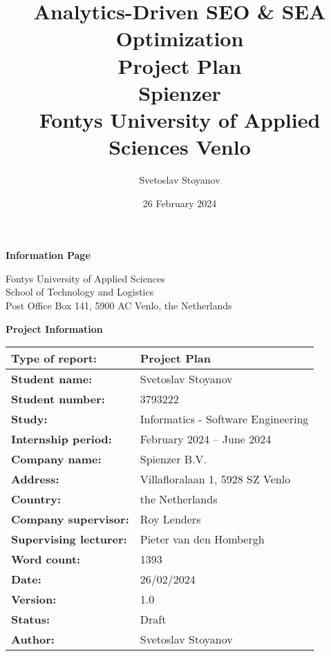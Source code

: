 \documentclass[12pt,a4paper]{article}
\title{
    {\Large Analytics-Driven SEO \& SEA Optimization}\\
    {\large Project Plan}\\[1em]
    {\normalsize \textbf{Spienzer}}\\
    {\normalsize Fontys University of Applied Sciences Venlo}
}
\author{Svetoslav Stoyanov}
\date{26 February 2024}
\begin{document}
\maketitle
\thispagestyle{empty}
\clearpage



\maketitle
\newpage

\begin{center}
    \Large\textbf{Information Page}


Fontys University of Applied Sciences\\

School of Technology and Logistics\\
Post Office Box 141, 5900 AC Venlo, the Netherlands
\end{center}



\begin{center}
    \Large\textbf{Project Information}

\vspace{1em} %

\begin{tabular}{|l|l|} \hline 
    \textbf{Type of report:} & Project Plan \\ \hline 
    \textbf{Student name:} & Svetoslav Stoyanov \\ \hline 
    \textbf{Student number:} & 3793222 \\ \hline 
    \textbf{Study:} & Informatics - Software Engineering \\ \hline 
    \textbf{Internship period:} & February 2024 – June 2024 \\ \hline 
    \textbf{Company name:} & Spienzer B.V. \\ \hline 
    \textbf{Address:} & Villafloralaan 1, 5928 SZ Venlo \\ \hline 
    \textbf{Country:} & the Netherlands \\ \hline 
    \textbf{Company supervisor:} & Roy Lenders \\ \hline 
    \textbf{Supervising lecturer:} & Pieter van den Hombergh \\ \hline 
    \textbf{Word count:} & 1393 \\ \hline 
    \textbf{Date:} & 26/02/2024 \\ \hline 
    \textbf{Version:} & 1.0 \\ \hline 
    \textbf{Status:} & Draft \\ \hline 
    \textbf{Author:} & Svetoslav Stoyanov \\ \hline
\end{tabular}
\end{center}
\end{document}
